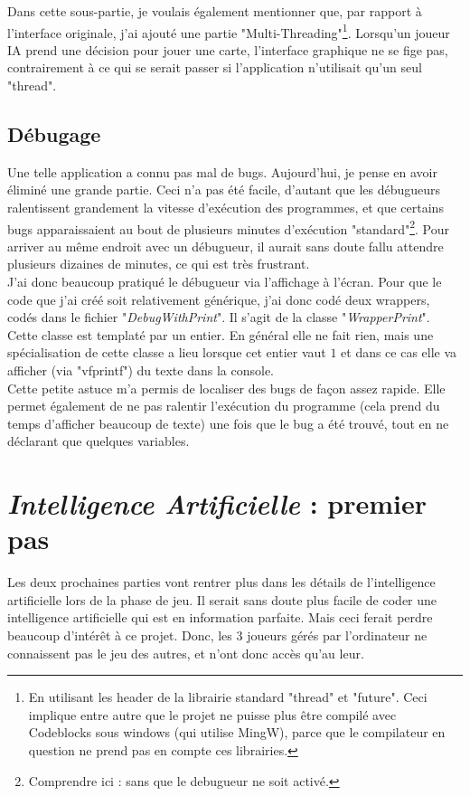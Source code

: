 \documentclass[a4paper,11pt]{article}
\begin{document}
Dans cette sous-partie, je voulais également mentionner que, par rapport à l'interface originale, j'ai ajouté une partie "Multi-Threading"\footnote{En utilisant les header de la librairie standard "thread" et "future". Ceci implique entre autre que le projet ne puisse plus être compilé avec Codeblocks sous windows (qui utilise MingW), parce que le compilateur en question ne prend pas en compte ces librairies.}. Lorsqu'un joueur IA prend une décision pour jouer une carte, l'interface graphique ne se fige pas, contrairement à ce qui se serait passer si l'application n'utilisait qu'un seul "thread".

\subsection{Débugage}

Une telle application a connu pas mal de bugs. Aujourd'hui, je pense en avoir éliminé une grande partie. Ceci n'a pas été facile, d'autant que les débugueurs ralentissent grandement la vitesse d'exécution des programmes, et que certains bugs apparaissaient au bout de plusieurs minutes d'exécution "standard"\footnote{Comprendre ici : sans que le debugueur ne soit activé.}. Pour arriver au même endroit avec un débugueur, il aurait sans doute fallu attendre plusieurs dizaines de minutes, ce qui est très frustrant. \\

J'ai donc beaucoup pratiqué le débugueur via l'affichage à l'écran. Pour que le code que j'ai créé soit relativement générique, j'ai donc codé deux wrappers, codés dans le fichier "\textit{DebugWithPrint}". Il s'agit de la classe "\textit{WrapperPrint}". Cette classe est templaté par un entier. En général elle ne fait rien, mais une spécialisation de cette classe a lieu lorsque cet entier vaut $1$ et dans ce cas elle va afficher (via "vfprintf") du texte dans la console. \\
Cette petite astuce m'a permis de localiser des bugs de façon assez rapide. Elle permet également de ne pas ralentir l'exécution du programme (cela prend du temps d'afficher beaucoup de texte) une fois que le bug a été trouvé, tout en ne déclarant que quelques variables.
\clearpage
\section{\textit{Intelligence Artificielle} : premier pas}
Les deux prochaines parties vont rentrer plus dans les détails de l'intelligence artificielle lors de la phase de jeu. Il serait sans doute plus facile de coder une intelligence artificielle qui est en information parfaite. Mais ceci ferait perdre beaucoup d'intérêt à ce projet. Donc, les 3 joueurs gérés par l'ordinateur ne connaissent pas le jeu des autres, et n'ont donc accès qu'au leur.\\
\end{document}
